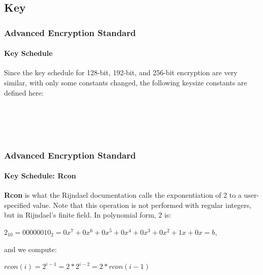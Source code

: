\subsection{Key}
\begin{frame}
	\frametitle{Advanced Encryption Standard}
		\framesubtitle{Key Schedule}
		\begin{block}{}
		{\normalsize
	Since the key schedule for 128-bit, 192-bit, and 256-bit encryption are very similar, with only some constants changed, the following keysize constants are defined here:}\\
	{\footnotesize
	\hspace{0.5cm}{• $n$ has a value of 16 for 128-bit keys, 24 for 192-bit keys, and 32 for 256-bit}\\ 
	\hspace{0.7cm}{keys}\\
	\hspace{0.5cm}{• $b$ has a value of 176 for 128-bit keys, 208 for 192-bit keys, and 240 for}\\ 
	\hspace{0.7cm}{256-bit keys (with 128-bit blocks as in AES, it is correspondingly larger}\\ 
	\hspace{0.7cm}{for variants of Rijndael with larger block sizes).}
	}
	\end{block}
\end{frame}

\begin{frame}
	\frametitle{Advanced Encryption Standard}
		\framesubtitle{Key Schedule: Rcon}
		{\normalsize
		\textbf{Rcon} is what the Rijndael documentation calls the exponentiation of 2 to a user-specified value. Note that this operation 	is not performed with regular integers, but in Rijndael's finite field. In polynomial form, 2 is:
		\vspace{0.2cm}
		\begin{block}{}
	$2_{10}=00000010_2=0x^7+0x^6+0x^5+0x^4+0x^3+0x^2+1x+0x=b $,\\
	\end{block}
	{and we compute:}\\
	\begin{block}{}
	$rcon(i)=2^{i-1}=2*2^{i-2}=2*rcon(i-1)$\\
	\end{block}
	}
\end{frame}

